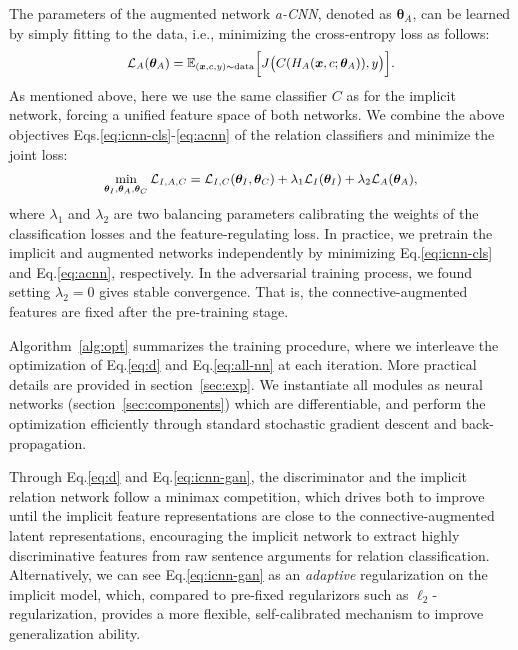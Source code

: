 \documentclass[11pt,a4paper]{article}
\newcommand{\E}{\mathbb{E}}
\begin{document}
The parameters of the augmented network {\it a-CNN}, denoted as $\bm{\theta}_A$, can be learned by simply fitting to the data, i.e., minimizing the cross-entropy loss as follows:
%
\begin{equation}\label{eq:acnn}
\small
\begin{split}
\mathcal{L}_{A}(\bm{\theta}_A) = \E_{(\bm{x},c,y)\sim \text{data}} \Big[ J\big(C(H_{A}(\bm{x}, c; \bm{\theta}_A)), y\big) \Big].
\end{split}
\end{equation}
As mentioned above, here we use the same classifier $C$ as for the implicit network, forcing a unified feature space of both networks. We combine the above objectives Eqs.\eqref{eq:icnn-cls}-\eqref{eq:acnn} of the relation classifiers and minimize the joint loss:
%
\begin{equation}\label{eq:all-nn}
\small
\begin{split}
\min_{\bm{\theta}_I, \bm{\theta}_A, \bm{\theta}_C} \mathcal{L}_{I,A,C} = \mathcal{L}_{I,C}(\bm{\theta}_I, \bm{\theta}_C) + \lambda_1 \mathcal{L}_{I}(\bm{\theta}_I) + \lambda_2 \mathcal{L}_{A}(\bm{\theta}_A),
\end{split}
\end{equation}
where $\lambda_1$ and $\lambda_2$ are two balancing parameters calibrating the weights of the classification losses and the feature-regulating loss. In practice, we pretrain the implicit and augmented networks independently by minimizing Eq.\eqref{eq:icnn-cls} and Eq.\eqref{eq:acnn}, respectively. In the adversarial training process, we found setting $\lambda_2=0$ gives stable convergence. That is, the connective-augmented features are fixed after the pre-training stage.

Algorithm~\ref{alg:opt} summarizes the training procedure, where we interleave the optimization of Eq.\eqref{eq:d} and Eq.\eqref{eq:all-nn} at each iteration. More practical details are provided in section~\ref{sec:exp}.
We instantiate all modules as neural networks (section~\ref{sec:components}) which are differentiable, and perform the optimization efficiently through standard stochastic gradient descent and back-propagation.

Through Eq.\eqref{eq:d} and Eq.\eqref{eq:icnn-gan}, the discriminator and the implicit relation network follow a minimax competition, which drives both to improve until the implicit feature representations are close to the connective-augmented latent representations, encouraging the implicit network to extract highly discriminative features from raw sentence arguments for relation classification. Alternatively, we can see Eq.\eqref{eq:icnn-gan} as an {\it adaptive} regularization on the implicit model, which, compared to pre-fixed regularizors such as $\ell_2$-regularization, provides a more flexible, self-calibrated mechanism to improve generalization ability.
\end{document}
